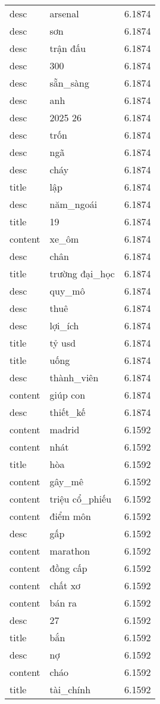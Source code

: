 \documentclass{article}
\begin{document}
\begin{tabular}{lll}
desc & arsenal & 6.1874\\
desc & sơn & 6.1874\\
desc & trận đấu & 6.1874\\
desc & 300 & 6.1874\\
desc & sẵn\_sàng & 6.1874\\
desc & anh & 6.1874\\
desc & 2025 26 & 6.1874\\
desc & trốn & 6.1874\\
desc & ngã & 6.1874\\
desc & cháy & 6.1874\\
title & lập & 6.1874\\
desc & năm\_ngoái & 6.1874\\
title & 19 & 6.1874\\
content & xe\_ôm & 6.1874\\
desc & chân & 6.1874\\
title & trường đại\_học & 6.1874\\
desc & quy\_mô & 6.1874\\
desc & thuê & 6.1874\\
desc & lợi\_ích & 6.1874\\
title & tỷ usd & 6.1874\\
title & uống & 6.1874\\
desc & thành\_viên & 6.1874\\
content & giúp con & 6.1874\\
desc & thiết\_kế & 6.1874\\
content & madrid & 6.1592\\
content & nhát & 6.1592\\
title & hòa & 6.1592\\
content & gây\_mê & 6.1592\\
content & triệu cổ\_phiếu & 6.1592\\
content & điểm môn & 6.1592\\
desc & gấp & 6.1592\\
content & marathon & 6.1592\\
content & đồng cấp & 6.1592\\
content & chất xơ & 6.1592\\
content & bán ra & 6.1592\\
desc & 27 & 6.1592\\
title & bắn & 6.1592\\
desc & nợ & 6.1592\\
content & cháo & 6.1592\\
title & tài\_chính & 6.1592\\

\end{tabular}
\end{document}
